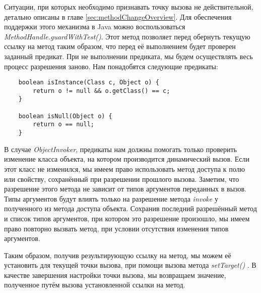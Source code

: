 Ситуации, при которых необходимо признавать точку вызова не действительной, детально описаны в главе \ref{sec:methodChangeOverview}. Для обеспечения поддержки этого механизма в Java можно воспользоваться \textit{MethodHandle.guardWithTest()}. Этот метод позволяет перед обернуть текущую ссылку на метод таким образом, что перед её выполнением будет проверен заданный предикат. При не выполнении предиката, мы будем осуществлять весь процесс разрешения заново. Нам понадобятся следующие предикаты:

\begin{verbatim}
    boolean isInstance(Class c, Object o) {
        return o != null && o.getClass() == c;
    }

    boolean isNull(Object o) {
        return o == null;
    }
\end{verbatim} 

В случае \textit{ObjectInvoker}, предикаты нам должны помогать только проверить изменение класса объекта, на котором производится динамический вызов. Если этот класс не изменился, мы имеем право использовать метод доступа к полю или свойству, сохранённый при разрешении прошлого вызова. Заметим, что разрешение этого метода не зависит от типов аргументов переданных в вызов. Типы аргументов будут влиять только на разрешение метода \textit{invoke} у полученного из метода доступа объекта. Сохранив последний разрешённый метод и список типов аргументов, при котором это разрешение произошло, мы имеем право повторно вызвать метод, при условии отсутствия изменения типов аргументов.

Таким образом, получив результирующую ссылку на метод, мы можем её установить для текущей точки вызова, при помощи вызова метода 	\textit{setTarget()} \cite{javadoc:MutableCallSite}. В качестве завершения настройки точки вызова, мы возвращаем значение, полученное путём вызова установленной ссылки на метод.
